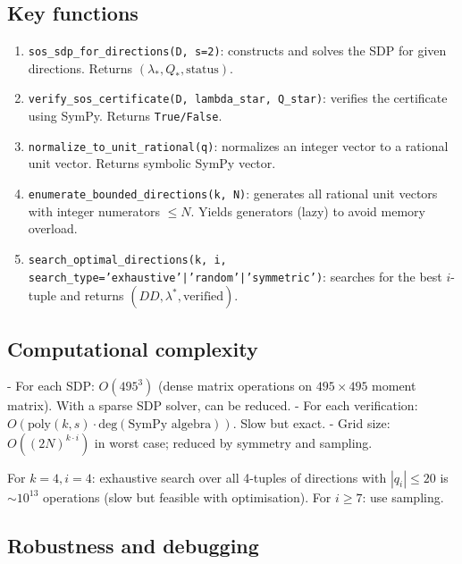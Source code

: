 \documentclass[12pt,a4paper]{article}
\begin{document}
\subsection*{Key functions}

\begin{enumerate}
  \item \texttt{sos\_sdp\_for\_directions(D, s=2)}: constructs and solves the SDP for
    given directions.  Returns $(\lambda_*, Q_*, \text{status})$.

  \item \texttt{verify\_sos\_certificate(D, lambda\_star, Q\_star)}: verifies the
    certificate using SymPy.  Returns \texttt{True/False}.

  \item \texttt{normalize\_to\_unit\_rational(q)}: normalizes an integer vector to a
    rational unit vector.  Returns symbolic SymPy vector.

  \item \texttt{enumerate\_bounded\_directions(k, N)}: generates all rational unit vectors
    with integer numerators $\leq N$.  Yields generators (lazy) to avoid memory overload.

  \item \texttt{search\_optimal\_directions(k, i, search\_type='exhaustive'|'random'|'symmetric')}:
    searches for the best $i$-tuple and returns $(DD, \lambda^*, \text{verified})$.
\end{enumerate}

\subsection*{Computational complexity}

- For each SDP: $O(495^3)$ (dense matrix operations on $495 \times 495$ moment matrix).
  With a sparse SDP solver, can be reduced.
- For each verification: $O(\text{poly}(k, s) \cdot \text{deg}(\text{SymPy algebra}))$.  Slow
  but exact.
- Grid size: $O((2N)^{k \cdot i})$ in worst case; reduced by symmetry and sampling.

For $k=4, i=4$: exhaustive search over all 4-tuples of directions with $|q_i| \leq 20$ is
$ \sim 10^{13}$ operations (slow but feasible with optimisation).  For $i \geq 7$: use
sampling.

\subsection*{Robustness and debugging}
\end{document}

